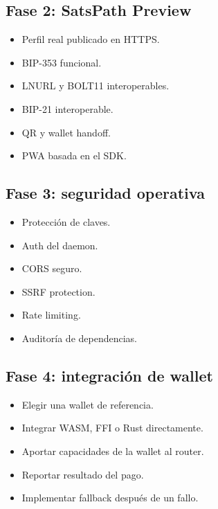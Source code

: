 \documentclass[
]{article}
\providecommand{\tightlist}{%
  \setlength{\itemsep}{0pt}\setlength{\parskip}{0pt}}
\begin{document}
\hypertarget{fase-2-satspath-preview}{%
\subsection{Fase 2: SatsPath Preview}\label{fase-2-satspath-preview}}

\begin{itemize}
\tightlist
\item
  Perfil real publicado en HTTPS.
\item
  BIP-353 funcional.
\item
  LNURL y BOLT11 interoperables.
\item
  BIP-21 interoperable.
\item
  QR y wallet handoff.
\item
  PWA basada en el SDK.
\end{itemize}

\hypertarget{fase-3-seguridad-operativa}{%
\subsection{Fase 3: seguridad
operativa}\label{fase-3-seguridad-operativa}}

\begin{itemize}
\tightlist
\item
  Protección de claves.
\item
  Auth del daemon.
\item
  CORS seguro.
\item
  SSRF protection.
\item
  Rate limiting.
\item
  Auditoría de dependencias.
\end{itemize}

\hypertarget{fase-4-integraciuxf3n-de-wallet}{%
\subsection{Fase 4: integración de
wallet}\label{fase-4-integraciuxf3n-de-wallet}}

\begin{itemize}
\tightlist
\item
  Elegir una wallet de referencia.
\item
  Integrar WASM, FFI o Rust directamente.
\item
  Aportar capacidades de la wallet al router.
\item
  Reportar resultado del pago.
\item
  Implementar fallback después de un fallo.
\end{itemize}
\end{document}
